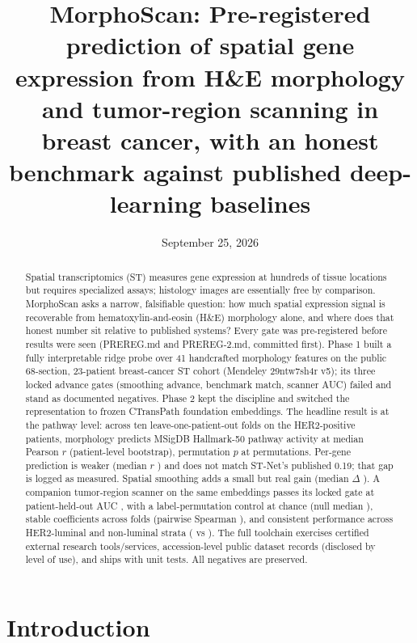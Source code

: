 \documentclass[11pt]{article}
\title{\color{msnblue}\textbf{MorphoScan: Pre-registered prediction of spatial gene expression from H\&E morphology and tumor-region scanning in breast cancer, with an honest benchmark against published deep-learning baselines}}
\author{}
\date{September 25, 2026}
\begin{document}
\maketitle
\thispagestyle{msn}
\begin{abstract}
\noindent Spatial transcriptomics (ST) measures gene expression at hundreds of tissue
locations but requires specialized assays; histology images are essentially free by
comparison. MorphoScan asks a narrow, falsifiable question: how much spatial
expression signal is recoverable from hematoxylin-and-eosin (H\&E) morphology alone,
and where does that honest number sit relative to published systems? Every gate was
pre-registered before results were seen (PREREG.md and PREREG-2.md, committed first).
Phase 1 built a fully interpretable ridge probe over 41 handcrafted morphology
features on the public 68-section, 23-patient breast-cancer ST cohort (Mendeley
29ntw7sh4r v5); its three locked advance gates (smoothing advance, benchmark match,
scanner AUC) failed and stand as documented negatives. Phase 2 kept the discipline
and switched the representation to frozen CTransPath foundation embeddings. The
headline result is at the pathway level: across ten leave-one-patient-out folds on
the HER2-positive patients, morphology predicts MSigDB Hallmark-50 pathway activity
at median Pearson $r$ \pPathwayR{} \pPathwayCI{} (patient-level bootstrap),
permutation $p$ \pPermPtenk{} at \pNperm{} permutations. Per-gene prediction is
weaker (median $r$ \pMoneR{} \pMoneCI) and does not match ST-Net's published 0.19;
that gap is logged as measured. Spatial smoothing adds a small but real gain
(median $\Delta$ \pDeltaR{} \pDeltaCI). A companion tumor-region scanner on the same
embeddings passes its locked gate at patient-held-out AUC \pScannerAuc{}
\pScannerCI{}, with a label-permutation control at chance (null median
\pScannerPermMed), stable coefficients across folds (pairwise Spearman
\pCoefStab), and consistent performance across HER2-luminal and non-luminal strata
(\pSubLum{} vs \pSubNonLum). The full toolchain exercises \numTools{} certified
external research tools/services, \numDatasets{} accession-level public dataset
records (disclosed by level of use), and ships with \numTests{} unit tests. All
negatives are preserved.
\end{abstract}

\section{Introduction}
\end{document}
